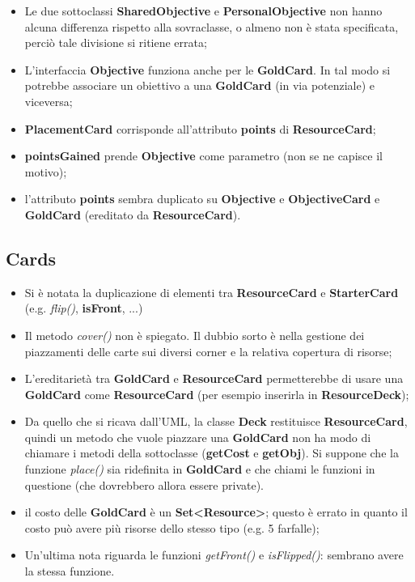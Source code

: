 \documentclass[12pt]{article}
\begin{document}
\begin{itemize}
    \item Le due sottoclassi \textbf{SharedObjective} e \textbf{PersonalObjective} non hanno alcuna differenza rispetto alla sovraclasse, o almeno non è stata specificata, perciò tale divisione si ritiene errata;
    
    \item L'interfaccia \textbf{Objective} funziona anche per le \textbf{GoldCard}. In tal modo si potrebbe associare un obiettivo a una \textbf{GoldCard} (in via potenziale) e viceversa;
    
    \item \textbf{PlacementCard} corrisponde all'attributo \textbf{points} di \textbf{ResourceCard};
    
    \item \textbf{pointsGained} prende \textbf{Objective} come parametro (non se ne capisce il motivo);

    \item l'attributo \textbf{points} sembra duplicato su \textbf{Objective} e  \textbf{ObjectiveCard} e \textbf{GoldCard} (ereditato da \textbf{ResourceCard}).
\end{itemize}

\subsection{Cards}

\begin{itemize}
    \item Si è notata la duplicazione di elementi tra \textbf{ResourceCard} e \textbf{StarterCard} (e.g. \textit{flip()}, \textbf{isFront}, ...)

    \item Il metodo \textit{cover()} non è spiegato. Il dubbio sorto è nella gestione dei piazzamenti delle carte sui diversi corner e la relativa copertura di risorse;

    \item L'ereditarietà tra \textbf{GoldCard} e \textbf{ResourceCard} permetterebbe di usare una \textbf{GoldCard} come \textbf{ResourceCard} (per esempio inserirla in \textbf{ResourceDeck});

    \item Da quello che si ricava dall'UML, la classe \textbf{Deck} restituisce \textbf{ResourceCard}, quindi un metodo che vuole piazzare una \textbf{GoldCard} non ha modo di chiamare i metodi della sottoclasse (\textbf{getCost} e \textbf{getObj}). Si suppone che la funzione \textit{place()} sia ridefinita in \textbf{GoldCard} e che chiami le funzioni in questione (che dovrebbero allora essere private).

    \item il costo delle \textbf{GoldCard} è un \textbf{Set<Resource>}; questo è errato in quanto il costo può avere più risorse dello stesso tipo (e.g. 5 farfalle);

    \item Un'ultima nota riguarda le funzioni \textit{getFront()} e \textit{isFlipped()}: sembrano avere la stessa funzione.
\end{itemize}
\end{document}
